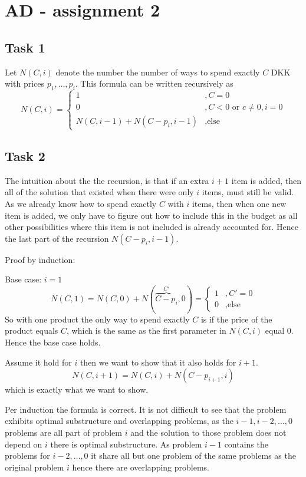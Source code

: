 \documentclass{report}
\begin{document}
\section*{AD - assignment 2}
\subsection*{Task 1}
Let $N(C, i)$ denote the number the number of ways to spend exactly $C$ DKK with prices $p_1,\ldots, p_i$. This formula can be written recursively as 
$$
N(C,i) = 
	\begin{cases}
		1 &, C = 0\\
		0 &, C < 0\text{ or } c\neq 0, i = 0 \\
		N(C, i-1) + N(C - p_i, i -1 ) &, \text{else}
	\end{cases}
$$
\subsection*{Task 2}
The intuition about the the recursion, is that if an extra $i+1$ item is added, then all of the solution that existed when there were only $i$ items, must still be valid. As we already know how to spend exactly $C$ with $i$ items, then when one new item is added, we only have to figure out how to include this in the budget as all other possibilities where this item is not included is already accounted for. Hence the last part of the recursion $N(C-p_i, i-1)$.

Proof by induction: 

\noindent
Base case: $i=1$
$$
N(C,1) = N(C, 0) + N(\overbrace{C - p_i}^{C'}, 0 ) = 
	\begin{cases}
		1 &, C' = 0\\
		0 &, \text{else}
	\end{cases}
$$
So with one product the only way to spend exactly $C$ is if the price of the product equals $C$, which is the same as the first parameter in $N(C,i)$ equal 0. Hence the base case holds.

\noindent
Assume it hold for $i$ then we want to show that it also holds for $i+1$. 
$$
N(C, i+1) = N(C, i) + N(C - p_{i+1}, i) 
$$
which is exactly what we want to show.

Per induction the formula is correct. It is not difficult to see that the problem exhibits optimal substructure and overlapping problems, as the $i-1, i-2, \ldots, 0$ problems are all part of problem $i$ and the solution to those problem does not depend on $i$ there is optimal substructure. As problem $i-1$ contains the problems for $i-2,\ldots,0$ it share all but one problem of the same problems as the original problem $i$ hence there are overlapping problems.
\end{document}
